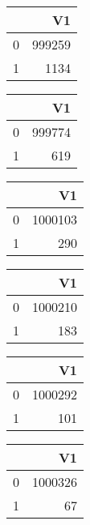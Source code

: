 \bigskip\bigskip
\centering
\begin{tabular}{rr}
  \hline
 & V1 \\ 
  \hline
0 & 999259 \\ 
  1 & 1134 \\ 
   \hline
\end{tabular}

\bigskip\bigskip
\centering
\begin{tabular}{rr}
  \hline
 & V1 \\ 
  \hline
0 & 999774 \\ 
  1 & 619 \\ 
   \hline
\end{tabular}

\bigskip\bigskip
\centering
\begin{tabular}{rr}
  \hline
 & V1 \\ 
  \hline
0 & 1000103 \\ 
  1 & 290 \\ 
   \hline
\end{tabular}

\bigskip\bigskip
\centering
\begin{tabular}{rr}
  \hline
 & V1 \\ 
  \hline
0 & 1000210 \\ 
  1 & 183 \\ 
   \hline
\end{tabular}

\bigskip\bigskip
\centering
\begin{tabular}{rr}
  \hline
 & V1 \\ 
  \hline
0 & 1000292 \\ 
  1 & 101 \\ 
   \hline
\end{tabular}

\bigskip\bigskip
\centering
\begin{tabular}{rr}
  \hline
 & V1 \\ 
  \hline
0 & 1000326 \\ 
  1 &  67 \\ 
   \hline
\end{tabular}

